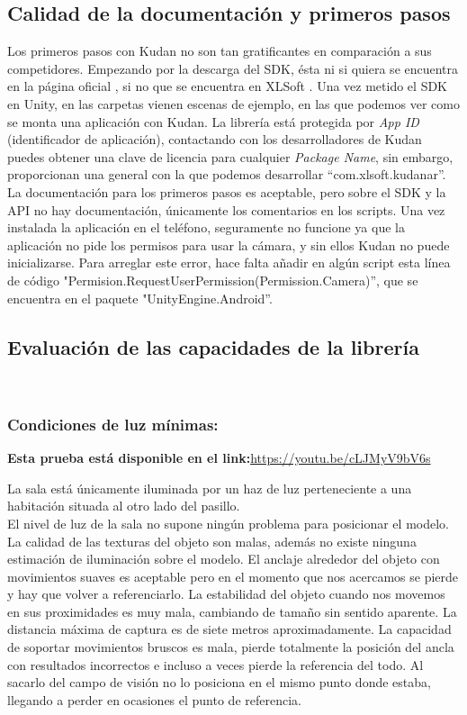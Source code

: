 \subsection{Calidad de la documentación y primeros pasos}
Los primeros pasos con Kudan no son tan gratificantes en comparación a sus competidores. Empezando por la descarga del SDK, ésta ni si quiera se encuentra en la página oficial \cite{Kudan_Official}, si no que se encuentra en XLSoft \cite{Kudan}. Una vez metido el SDK en Unity, en las carpetas vienen escenas de ejemplo, en las que podemos ver como se monta una aplicación con Kudan. La librería está protegida por \textit{App ID} (identificador de aplicación), contactando con los desarrolladores de Kudan puedes obtener una clave de licencia para cualquier \textit{Package Name}, sin embargo, proporcionan una general con la que podemos desarrollar ``com.xlsoft.kudanar''. \cite{Kudan_License}La documentación para los primeros pasos es aceptable, pero sobre el SDK y la API no hay documentación, únicamente los comentarios en los scripts. Una vez instalada la aplicación en el teléfono, seguramente no funcione ya que la aplicación no pide los permisos para usar la cámara, y sin ellos Kudan no puede inicializarse. Para arreglar este error, hace falta añadir en algún script esta línea de código "Permision.RequestUserPermission(Permission.Camera)'', que se encuentra en el paquete "UnityEngine.Android''.
\subsection{Evaluación de las capacidades de la librería}\\
\subsubsection{Condiciones de luz mínimas:}

\textbf{Esta prueba está disponible en el link:}\url{https://youtu.be/cLJMyV9bV6s}

La sala está únicamente iluminada por un haz de luz perteneciente a una habitación situada al otro lado del pasillo.\\

El nivel de luz de la sala no supone ningún problema para posicionar el modelo. La calidad de las texturas del objeto son malas, además no existe ninguna estimación de iluminación sobre el modelo. El anclaje alrededor del objeto con movimientos suaves es aceptable pero en el momento que nos acercamos se pierde y hay que volver a referenciarlo. La estabilidad del objeto cuando nos movemos en sus proximidades es muy mala, cambiando de tamaño sin sentido aparente. La distancia máxima de captura es de siete metros aproximadamente. La capacidad de soportar movimientos bruscos es mala, pierde totalmente la posición del ancla con resultados incorrectos e incluso a veces pierde la referencia del todo. Al sacarlo del campo de visión no lo posiciona en el mismo punto donde estaba, llegando a perder en ocasiones el punto de referencia.

